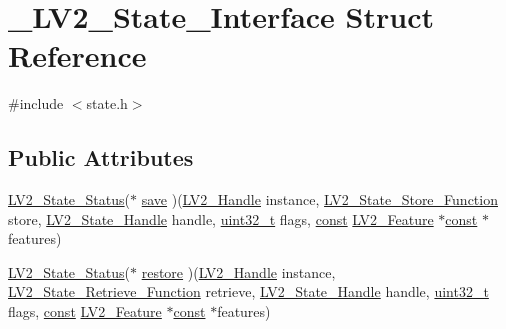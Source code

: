 \hypertarget{struct___l_v2___state___interface}{}\section{\+\_\+\+L\+V2\+\_\+\+State\+\_\+\+Interface Struct Reference}
\label{struct___l_v2___state___interface}


{\ttfamily \#include $<$state.\+h$>$}

\subsection*{Public Attributes}
\begin{DoxyCompactItemize}
\item 
\hyperlink{state_8h_afb5cc1033410d51fdcdbfdd09fc7d808}{L\+V2\+\_\+\+State\+\_\+\+Status}($\ast$ \hyperlink{struct___l_v2___state___interface_ae564742663a6d908d9745c9eb8bdb347}{save} )(\hyperlink{lv2_8h_a95eafb0a5290f30bcdc8c0f8eb992eaf}{L\+V2\+\_\+\+Handle} instance, \hyperlink{state_8h_a609f1abc2c5891f85c276f52394cb6d6}{L\+V2\+\_\+\+State\+\_\+\+Store\+\_\+\+Function} store, \hyperlink{state_8h_a385b5b586c09dd03f1065cd0105daa6d}{L\+V2\+\_\+\+State\+\_\+\+Handle} handle, \hyperlink{lib-src_2ffmpeg_2win32_2stdint_8h_a6eb1e68cc391dd753bc8ce896dbb8315}{uint32\+\_\+t} flags, \hyperlink{getopt1_8c_a2c212835823e3c54a8ab6d95c652660e}{const} \hyperlink{lv2_8h_a78d13b607443404459db283371723234}{L\+V2\+\_\+\+Feature} $\ast$\hyperlink{getopt1_8c_a2c212835823e3c54a8ab6d95c652660e}{const} $\ast$features)
\item 
\hyperlink{state_8h_afb5cc1033410d51fdcdbfdd09fc7d808}{L\+V2\+\_\+\+State\+\_\+\+Status}($\ast$ \hyperlink{struct___l_v2___state___interface_af1b48ea50175bfef63d4dd35d09d90b8}{restore} )(\hyperlink{lv2_8h_a95eafb0a5290f30bcdc8c0f8eb992eaf}{L\+V2\+\_\+\+Handle} instance, \hyperlink{state_8h_a722a422fa5c4e623240387dcec82c064}{L\+V2\+\_\+\+State\+\_\+\+Retrieve\+\_\+\+Function} retrieve, \hyperlink{state_8h_a385b5b586c09dd03f1065cd0105daa6d}{L\+V2\+\_\+\+State\+\_\+\+Handle} handle, \hyperlink{lib-src_2ffmpeg_2win32_2stdint_8h_a6eb1e68cc391dd753bc8ce896dbb8315}{uint32\+\_\+t} flags, \hyperlink{getopt1_8c_a2c212835823e3c54a8ab6d95c652660e}{const} \hyperlink{lv2_8h_a78d13b607443404459db283371723234}{L\+V2\+\_\+\+Feature} $\ast$\hyperlink{getopt1_8c_a2c212835823e3c54a8ab6d95c652660e}{const} $\ast$features)
\end{DoxyCompactItemize}


